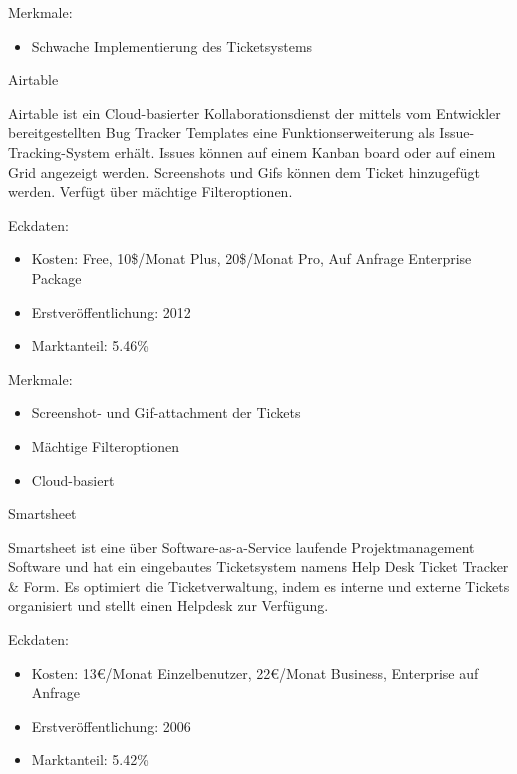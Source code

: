 				Merkmale:
				\begin{itemize}
					\item Schwache Implementierung des Ticketsystems
				\end{itemize}
				

				

				Airtable
				
Airtable ist ein Cloud-basierter Kollaborationsdienst der mittels vom Entwickler bereitgestellten Bug Tracker Templates eine Funktionserweiterung als Issue-Tracking-System erhält. Issues können auf einem Kanban board oder auf einem Grid angezeigt werden. Screenshots und Gifs können dem Ticket hinzugefügt werden. Verfügt über mächtige Filteroptionen.

				
					Eckdaten:
				\begin{itemize}
					\item Kosten: Free, 10\$/Monat Plus, 20\$/Monat Pro, Auf Anfrage Enterprise Package
					\item Erstveröffentlichung: 2012 
					\item Marktanteil: 5.46\%
				\end{itemize}
				
				Merkmale:
				\begin{itemize}
					\item Screenshot- und Gif-attachment der Tickets
					\item Mächtige Filteroptionen
					\item Cloud-basiert
				\end{itemize}
				

				
				
				Smartsheet
				
				Smartsheet ist eine über Software-as-a-Service laufende Projektmanagement Software und hat ein eingebautes Ticketsystem namens Help Desk Ticket Tracker \& Form. Es optimiert die Ticketverwaltung, indem es interne und externe Tickets organisiert und stellt einen Helpdesk zur Verfügung. 
				
					Eckdaten:
				\begin{itemize}
					\item Kosten: 13€/Monat Einzelbenutzer, 22€/Monat Business, Enterprise auf Anfrage
					\item Erstveröffentlichung: 2006
					\item Marktanteil: 5.42\%
				\end{itemize}
				
